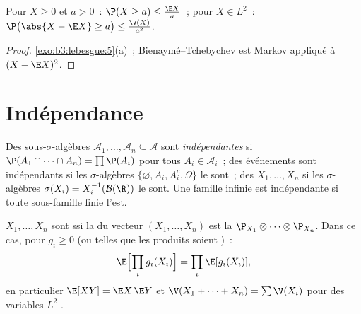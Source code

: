 \begin{proposition}
\label{prop:b3:probability:markov}
Pour $X \geq 0$ et $a > 0$~: $\P(X \geq a) \leq \frac{\E
X}{a}$~; pour $X \in L^2$~: $\P\bigl(\abs{X - \E X} \geq
a\bigr) \leq \frac{\V(X)}{a^2}$.
\end{proposition}

\begin{proof}
\cref{exo:b3:lebesgue:5}(a)~; Bienaymé--Tchebychev est Markov
appliqué à $(X - \E X)^2$.
\end{proof}

\section{Indépendance}

\begin{definition}\label{def:b3:probability:independence}
Des sous-$\sigma$-algèbres $\mathcal A_1, \dots, \mathcal
A_n \subseteq \mathcal A$ sont
\emph{indépendantes} si
$\P(A_1\cap\dots\cap A_n) = \prod\P(A_i)$ pour tous $A_i
\in \mathcal A_i$~; des événements sont indépendants si les
$\sigma$-algèbres $\{\varnothing, A_i, A_i^c, \Omega\}$ le
sont~; des  $X_1, \dots, X_n$ si les
$\sigma$-algèbres $\sigma(X_i) = X_i^{-1}(\mathcal B(\R))$ le
sont. Une famille infinie est indépendante si toute
sous-famille finie l'est.
\end{definition}

\begin{theorem}\label{thm:b3:probability:independence}
$X_1, \dots, X_n$ sont  ssi la  du vecteur
$(X_1, \dots, X_n)$ est la 
$\P_{X_1}\otimes\cdots\otimes\P_{X_n}$. Dans ce cas, pour
$g_i \geq 0$ (ou telles que les produits soient
)~:
\[
\E\Bigl[\prod_ig_i(X_i)\Bigr] = \prod_i\E[g_i(X_i)],
\]
en particulier $\E[XY] = \E X\,\E Y$ et $\V(X_1 + \dots +
X_n) = \sum\V(X_i)$ pour des variables $L^2$ .
\end{theorem}


